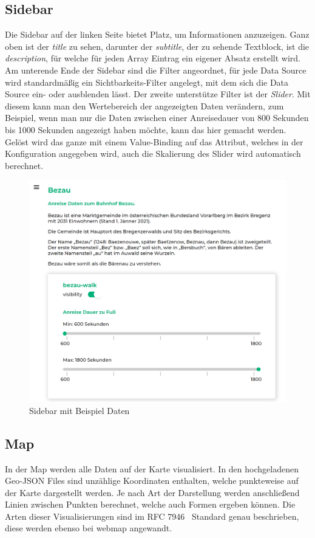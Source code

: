 \subsection{Sidebar}\label{subsec:sidebar}
Die Sidebar auf der linken Seite bietet Platz, um Informationen anzuzeigen.
Ganz oben ist der \emph{title} zu sehen, darunter der \emph{subtitle}, der zu sehende Textblock, ist die \emph{description},
für welche für jeden Array Eintrag ein eigener Absatz erstellt wird.
Am unterende Ende der Sidebar sind die Filter angeordnet, für jede Data Source wird standardmäßig ein Sichtbarkeits-Filter angelegt,
mit dem sich die Data Source ein- oder ausblenden lässt.
Der zweite unterstütze Filter ist der \emph{Slider}.
Mit diesem kann man den Wertebereich der angezeigten Daten verändern, zum Beispiel, wenn man nur die Daten zwischen
einer Anreisedauer von 800 Sekunden bis 1000 Sekunden angezeigt haben möchte, kann das hier gemacht werden.
Gelöst wird das ganze mit einem Value-Binding auf das Attribut, welches in der Konfiguration angegeben wird, auch
die Skalierung des Slider wird automatisch berechnet.

\begin{figure}[hbt!]
    \centering
    \includegraphics[scale=.7]{pics/sidebar}
    \caption{Sidebar mit Beispiel Daten}
    \label{fig:sidebar}
\end{figure}

\subsection{Map}\label{subsec:map}
In der Map werden alle Daten auf der Karte visualisiert.
In den hochgeladenen Geo-JSON Files sind unzählige Koordinaten enthalten, welche punkteweise auf der Karte dargestellt werden.
Je nach Art der Darstellung werden anschließend Linien zwischen Punkten berechnet, welche auch Formen ergeben können.
Die Arten dieser Visualisierungen sind im RFC 7946~\cite{rfc7946} Standard genau beschrieben, diese werden ebenso bei webmap angewandt.

